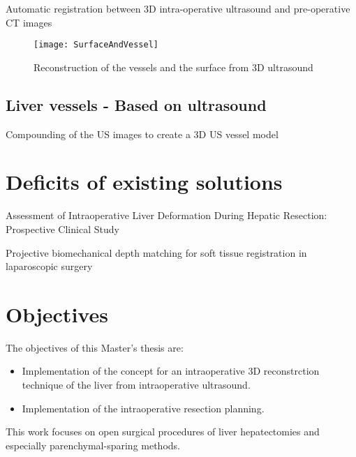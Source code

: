 Automatic registration between 3D intra-operative ultrasound and pre-operative
CT images \cite{nam2011automatic}
\begin{figure}[H]
  \centering
 \texttt{[image: SurfaceAndVessel]}
 \caption{Reconstruction of the vessels and the surface from 3D ultrasound \cite{nam2011automatic}}
  \label{fig:SurfaceAndVessel}
\end{figure}

\subsection{Liver vessels - Based on ultrasound}
Compounding of the US images to create a 3D US vessel model \cite{ribes2012image}



\section{Deficits of existing solutions}
Assessment of Intraoperative Liver Deformation During Hepatic Resection:
Prospective Clinical Study \cite{heizmann2010assessment}

Projective biomechanical depth matching for soft tissue registration in
laparoscopic surgery \cite{reichard2017projective}

\section{Objectives} 
The objectives of this Master's thesis are:
\begin{itemize}
  \item Implementation of the concept for an intraoperative 3D reconstrction
  technique of the liver from intraoperative ultrasound. 
  \item Implementation of the intraoperative resection planning.
\end{itemize}
This work focuses on open surgical procedures of liver hepatectomies and
especially parenchymal-sparing methods.






